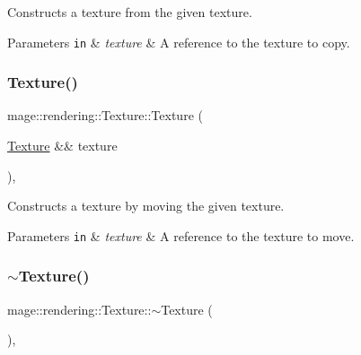 Constructs a texture from the given texture.


\begin{DoxyParams}[1]{Parameters}
\mbox{\tt in}  & {\em texture} & A reference to the texture to copy. \\
\hline
\end{DoxyParams}
\hypertarget{classmage_1_1rendering_1_1_texture_a25eb2aa2277478fb5c17af996d509c57}{}\label{classmage_1_1rendering_1_1_texture_a25eb2aa2277478fb5c17af996d509c57} 
\subsubsection{\texorpdfstring{Texture()}{Texture()}\hspace{0.1cm}{\footnotesize\ttfamily [4/4]}}
{\footnotesize\ttfamily mage\+::rendering\+::\+Texture\+::\+Texture (\begin{DoxyParamCaption}\item[{\hyperlink{classmage_1_1rendering_1_1_texture}{Texture} \&\&}]{texture }\end{DoxyParamCaption})\hspace{0.3cm}{\ttfamily [default]}, {\ttfamily [noexcept]}}

Constructs a texture by moving the given texture.


\begin{DoxyParams}[1]{Parameters}
\mbox{\tt in}  & {\em texture} & A reference to the texture to move. \\
\hline
\end{DoxyParams}
\hypertarget{classmage_1_1rendering_1_1_texture_af0ca576b1131fc0ac70725127b4fa7e4}{}\label{classmage_1_1rendering_1_1_texture_af0ca576b1131fc0ac70725127b4fa7e4} 
\subsubsection{\texorpdfstring{$\sim$\+Texture()}{~Texture()}}
{\footnotesize\ttfamily mage\+::rendering\+::\+Texture\+::$\sim$\+Texture (\begin{DoxyParamCaption}{ }\end{DoxyParamCaption})\hspace{0.3cm}{\ttfamily [virtual]}, {\ttfamily [default]}}

